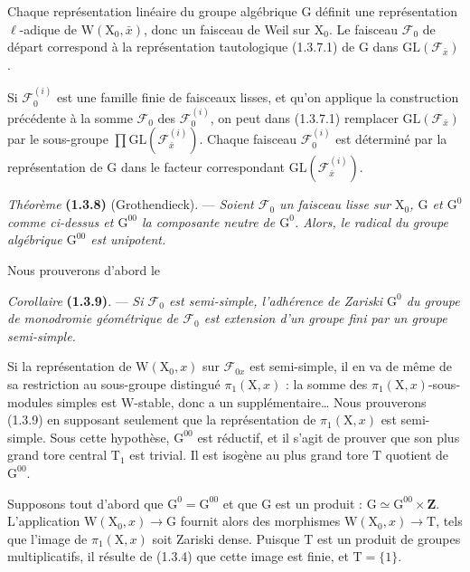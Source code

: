 \documentclass[11pt,leqno]{article}
\begin{document}
Chaque représentation linéaire du groupe algébrique \(\mathrm{G}\) définit une représentation \(\ell\)-adique de \(\mathrm{W}(\mathrm{X}_0,\bar{x})\), donc un faisceau de Weil sur \(\mathrm{X}_0\). Le faisceau \(\mathscr{F}_0\) de départ correspond à la représentation tautologique (1.3.7.1) de \(\mathrm{G}\) dans \(\mathrm{GL}(\mathscr{F}_{\bar{x}})\).

Si \(\mathscr{F}_0^{(i)}\) est une famille finie de faisceaux lisses, et qu’on applique la construction précédente à la somme \(\mathscr{F}_0\) des \(\mathscr{F}_0^{(i)}\), on peut dans (1.3.7.1) remplacer \(\mathrm{GL}(\mathscr{F}_{\bar{x}})\) par le sous-groupe \(\prod\mathrm{GL}(\mathscr{F}_{\bar{x}}^{(i)})\). Chaque faisceau \(\mathscr{F}_0^{(i)}\) est déterminé par la représentation de \(\mathrm{G}\) dans le facteur correspondant \(\mathrm{GL}(\mathscr{F}_{\bar{x}}^{(i)})\).

\textit{Théorème} \textbf{(1.3.8)} (Grothendieck). — \textit{Soient \(\mathscr{F}_0\) un faisceau lisse sur \(\mathrm{X}_0\), \(\mathrm{G}\) et \(\mathrm{G}^0\) comme ci-dessus et \(\mathrm{G}^{00}\) la composante neutre de \(\mathrm{G}^0\). Alors, le radical du groupe algébrique \(\mathrm{G}^{00}\) est unipotent.}

Nous prouverons d’abord le

\textit{Corollaire} \textbf{(1.3.9)}. — \textit{Si \(\mathscr{F}_0\) est semi-simple, l’adhérence de Zariski \(\mathrm{G}^0\) du groupe de monodromie géométrique de \(\mathscr{F}_0\) est extension d’un groupe fini par un groupe semi-simple.}

Si la représentation de \(\mathrm{W}(\mathrm{X}_0,x)\) sur \(\mathscr{F}_{0x}\) est semi-simple, il en va de même de sa restriction au sous-groupe distingué \(\pi_1(\mathrm{X},x)\) : la somme des \(\pi_1(\mathrm{X},x)\)-sous-modules simples est \(\mathrm{W}\)-stable, donc a un supplémentaire\ldots{} Nous prouverons (1.3.9) en supposant seulement que la représentation de \(\pi_1(\mathrm{X},x)\) est semi-simple. Sous cette hypothèse, \(\mathrm{G}^{00}\) est réductif, et il s’agit de prouver que son plus grand tore central \(\mathrm{T}_1\) est trivial. Il est isogène au plus grand tore \(\mathrm{T}\) quotient de \(\mathrm{G}^{00}\).

Supposons tout d’abord que \(\mathrm{G}^0=\mathrm{G}^{00}\) et que \(\mathrm{G}\) est un produit : \(\mathrm{G}\simeq\mathrm{G}^{00}\times\mathbf{Z}\). L’application \(\mathrm{W}(\mathrm{X}_0,x)\to\mathrm{G}\) fournit alors des morphismes \(\mathrm{W}(\mathrm{X}_0,x)\to\mathrm{T}\), tels que l’image de \(\pi_1(\mathrm{X},x)\) soit Zariski dense. Puisque \(\mathrm{T}\) est un produit de groupes multiplicatifs, il résulte de (1.3.4) que cette image est finie, et \(\mathrm{T}=\{1\}\).
\end{document}
